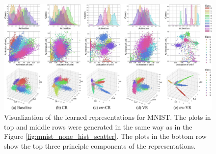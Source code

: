 \begin{figure}[t]
\centering
\centerline{\includegraphics[width=1\textwidth]{representation_characteristics.pdf}}
\caption{Visualization of the learned representations for MNIST. The plots in top and middle rows were generated in the same way as in the Figure \ref{fig:mnist_none_hist_scatter}. The plots in the bottom row show the top three principle components of the representations. 
}
\label{fig:representation}
\end{figure}

